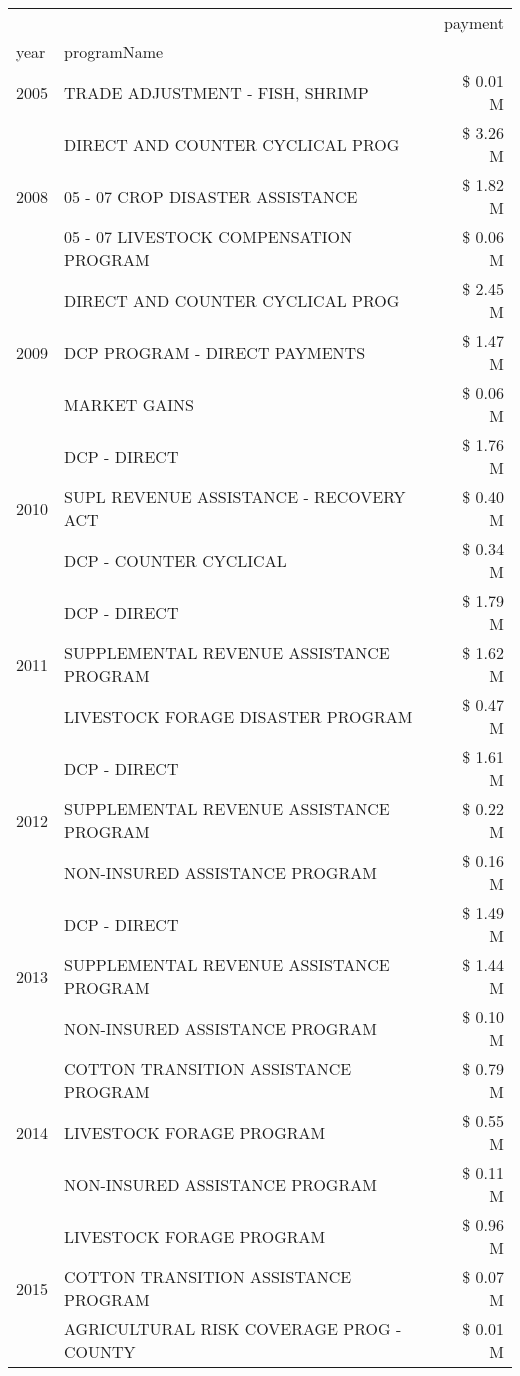 \begin{tabular}{llr}
\toprule
 &  & payment \\
year & programName &  \\
\midrule
2005 & TRADE ADJUSTMENT - FISH, SHRIMP & \$ 0.01 M \\
\cline{1-3}
\multirow[t]{3}{*}{2008} & DIRECT AND COUNTER CYCLICAL PROG & \$ 3.26 M \\
 & 05 - 07 CROP DISASTER ASSISTANCE & \$ 1.82 M \\
 & 05 - 07 LIVESTOCK COMPENSATION PROGRAM & \$ 0.06 M \\
\cline{1-3}
\multirow[t]{3}{*}{2009} & DIRECT AND COUNTER CYCLICAL PROG & \$ 2.45 M \\
 & DCP PROGRAM - DIRECT PAYMENTS & \$ 1.47 M \\
 & MARKET GAINS & \$ 0.06 M \\
\cline{1-3}
\multirow[t]{3}{*}{2010} & DCP - DIRECT & \$ 1.76 M \\
 & SUPL REVENUE ASSISTANCE - RECOVERY ACT & \$ 0.40 M \\
 & DCP - COUNTER CYCLICAL & \$ 0.34 M \\
\cline{1-3}
\multirow[t]{3}{*}{2011} & DCP - DIRECT & \$ 1.79 M \\
 & SUPPLEMENTAL REVENUE ASSISTANCE PROGRAM & \$ 1.62 M \\
 & LIVESTOCK FORAGE DISASTER PROGRAM & \$ 0.47 M \\
\cline{1-3}
\multirow[t]{3}{*}{2012} & DCP - DIRECT & \$ 1.61 M \\
 & SUPPLEMENTAL REVENUE ASSISTANCE PROGRAM & \$ 0.22 M \\
 & NON-INSURED ASSISTANCE PROGRAM & \$ 0.16 M \\
\cline{1-3}
\multirow[t]{3}{*}{2013} & DCP - DIRECT & \$ 1.49 M \\
 & SUPPLEMENTAL REVENUE ASSISTANCE PROGRAM & \$ 1.44 M \\
 & NON-INSURED ASSISTANCE PROGRAM & \$ 0.10 M \\
\cline{1-3}
\multirow[t]{3}{*}{2014} & COTTON TRANSITION ASSISTANCE PROGRAM & \$ 0.79 M \\
 & LIVESTOCK FORAGE PROGRAM & \$ 0.55 M \\
 & NON-INSURED ASSISTANCE PROGRAM & \$ 0.11 M \\
\cline{1-3}
\multirow[t]{3}{*}{2015} & LIVESTOCK FORAGE PROGRAM & \$ 0.96 M \\
 & COTTON TRANSITION ASSISTANCE PROGRAM & \$ 0.07 M \\
 & AGRICULTURAL RISK COVERAGE PROG - COUNTY & \$ 0.01 M \\

\end{tabular}
